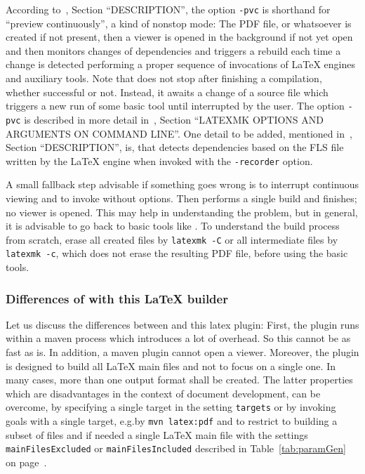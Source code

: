 According to~\cite{LatexMk23}, Section ``DESCRIPTION'', 
the option \texttt{-pvc} is shorthand for ``preview continuously'', 
a kind of nonstop mode: 
The PDF file, or whatsoever is created if not present, 
then a viewer is opened in the background 
if not yet open 
and then  monitors changes of dependencies 
and triggers a rebuild each time a change is detected 
performing a proper sequence of invocations of \LaTeX{} engines and auxiliary tools. 
Note that  does not stop after finishing a compilation, 
whether successful or not. 
Instead, it awaits a change of a source file 
which triggers a new run of some basic tool 
until interrupted by the user. 
The option \texttt{-pvc} is described in more detail 
in~\cite{LatexMk23}, Section ``LATEXMK OPTIONS AND ARGUMENTS ON COMMAND LINE''. 
One detail to be added, mentioned in~\cite{LatexMk23}, Section ``DESCRIPTION'', is, 
that  detects dependencies 
based on the FLS file written by the \LaTeX{} engine 
when invoked with the \texttt{-recorder} option. 

A small fallback step advisable if something goes wrong 
is to interrupt continuous viewing and to invoke  without options. 
Then  performs a single build and finishes; no viewer is opened. 
This may help in understanding the problem, 
but in general, it is advisable to go back to basic tools like \lualatex. 
To understand the build process from scratch, 
erase all created files by \texttt{latexmk -C} 
or all intermediate files by \texttt{latexmk -c}, which does not erase the resulting PDF file, 
before using the basic tools. 
\medskip

\subsubsection{Differences of  with this \LaTeX{} builder}%
\label{subsubsec:latexmkDiff}


Let us discuss the differences between  and this latex plugin: 
First, the plugin runs within a maven process which introduces a lot of overhead. 
So this cannot be as fast as  is. 
In addition, a maven plugin cannot open a viewer. 
Moreover, the plugin is designed to build all \LaTeX{} main files %
and not to focus on a single one. 
In many cases, more than one output format shall be created. 
The latter properties which are disadvantages in the context of document development, 
can be overcome, by specifying a single target in the setting \texttt{targets} 
or by invoking goals with a single target, e.g.\@ by \texttt{mvn latex:pdf} 
and to restrict to building a subset of files and if needed a single \LaTeX{} main file
with the settings \texttt{mainFilesExcluded} or \texttt{mainFilesIncluded} 
described in Table~\ref{tab:paramGen} on page~\pageref{tab:paramGen}. 

